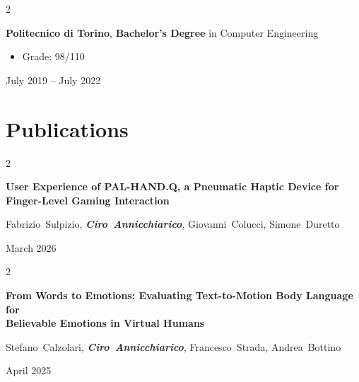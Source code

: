 \documentclass[10pt, letterpaper]{article}
\newenvironment{highlights}{
    \begin{itemize}[
        topsep=0.10 cm,
        parsep=0.10 cm,
        partopsep=0pt,
        itemsep=0pt,
        leftmargin=0.4 cm + 10pt
    ]
}{
    \end{itemize}
} %
\newenvironment{twocolentry}[2][]{
    \onecolentry
    \def\secondColumn{#2}
    \setcolumnwidth{\fill, 4.5 cm}
    \begin{paracol}{2}
}{
    \switchcolumn \raggedleft \secondColumn
    \end{paracol}
    \endonecolentry
} %
\let\hrefWithoutArrow\href
\renewcommand{\href}[2]{\hrefWithoutArrow{#1}{\ifthenelse{\equal{#2}{}}{ }{#2 }\raisebox{.15ex}{\footnotesize \faExternalLink*}}}
\begin{document}
        \begin{twocolentry}{
            July 2019 – July 2022
        }
            \textbf{Politecnico di Torino}, \textbf{Bachelor's Degree} in Computer Engineering
            \begin{highlights}
                \item Grade: 98/110 
            \end{highlights}
        \end{twocolentry}
         
     \section{Publications}
        \begin{samepage}
        
             \begin{twocolentry}{
                 March 2026
             }
                 \textbf{User Experience of PAL-HAND.Q, a Pneumatic Haptic Device for Finger-Level Gaming Interaction}

                 \vspace{0.10 cm}

                 \mbox{Fabrizio Sulpizio}, \mbox{\textbf{\textit{Ciro Annicchiarico}}}, \mbox{Giovanni Colucci}, \mbox{Simone Duretto}
                 \vspace{0.10 cm}
         \href{https://www.researchgate.net/publication/402144416_User_Experience_of_PAL-HANDQ_a_Pneumatic_Haptic_Device_for_Finger-Level_Gaming_Interaction}{}
             \end{twocolentry}
             
             \begin{twocolentry}{
                 April 2025
             }
                 \textbf{From Words to Emotions: Evaluating Text-to-Motion Body Language for\\Believable Emotions in Virtual Humans}

                 \vspace{0.10 cm}

                 \mbox{Stefano Calzolari}, \mbox{\textbf{\textit{Ciro Annicchiarico}}}, \mbox{Francesco Strada}, \mbox{Andrea Bottino}
                 \vspace{0.10 cm}
         \href{https://www.researchgate.net/publication/395237743_From_Words_to_Emotions_Evaluating_Text-to-Motion_Body_Language_for_Believable_Emotions_in_Virtual_Humans}{}
             \end{twocolentry}

         \end{samepage}
\end{document}
